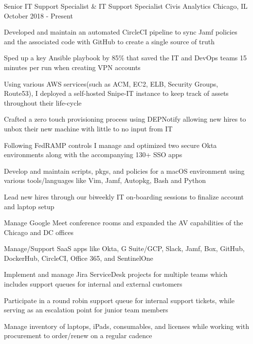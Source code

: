 

\begin{cventries}

	\cventry
	{Senior IT Support Specialist \& IT Support Specialist} %
	{Civis Analytics} %
	{Chicago, IL} %
	{October 2018 - Present} %
	{
		\begin{cvitems} %
			\item {Developed and maintain an automated CircleCI pipeline to sync Jamf policies and the associated code with GitHub to create a single source of truth}
			\item {Sped up a key Ansible playbook by 85\% that saved the IT and DevOps teams 15 minutes per run when creating VPN accounts}
			\item {Using various AWS services(such as ACM, EC2, ELB, Security Groups, Route53), I deployed a self-hosted Snipe-IT instance to keep track of assets throughout their life-cycle}
			\item {Crafted a zero touch provisioning process using DEPNotify allowing new hires to unbox their new machine with little to no input from IT}
			\item {Following FedRAMP controls I manage and optimized two secure Okta environments along with the accompanying 130+ SSO apps}
			\item {Develop and maintain scripts, pkgs, and policies for a macOS environment using various tools/languages like Vim, Jamf, Autopkg, Bash and Python}
			\item {Lead new hires through our biweekly IT on-boarding sessions to finalize account and laptop setup}
			\item {Manage Google Meet conference rooms and expanded the AV capabilities of the Chicago and DC offices}
			\item {Manage/Support SaaS apps like Okta, G Suite/GCP, Slack, Jamf, Box, GitHub, DockerHub, CircleCI, Office 365, and SentinelOne}
			\item {Implement and manage Jira ServiceDesk projects for multiple teams which includes support queues for internal and external customers}
			\item {Participate in a round robin support queue for internal support tickets, while serving as an escalation point for junior team members}
			\item {Manage inventory of laptops, iPads, consumables, and licenses while working with procurement to order/renew on a regular cadence}
		\end{cvitems}
	}


\end{cventries}
